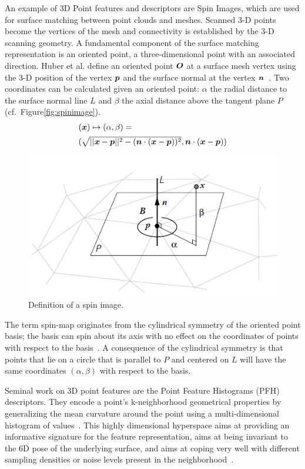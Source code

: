 \documentclass[twocolumn,oneside]{book}
\newcommand{\V}[1]{\vector{#1}}  %
\begin{document}
\begin{itemize}
  An example of 3D Point features and descriptors are Spin Images,
  which are used for surface matching between point clouds and meshes.
  Scanned 3-D points become the vertices of the mesh and connectivity
  is established by the 3-D scanning geometry. A fundamental component
  of the surface matching representation is an oriented point, a
  three-dimensional point with an associated direction.  Huber et
  al. define an oriented point $\V O$ at a surface mesh vertex using
  the 3-D position of the vertex $\V p$ and the surface normal at the
  vertex $\V n$~\cite{HuberPhD}.  Two coordinates can be calculated
  given an oriented point: $\alpha$ the radial distance to the surface
  normal line $L$ and $\beta$ the axial distance above the tangent
  plane $P$ (cf.~Figure\ref{fig:spinimage}).
  \begin{align*}
    \begin{array}{l}
  (\V x) \mapsto (\alpha, \beta) = \\[1.1ex]
    (\sqrt{||\V x - \V p||^2 - ( \V n \cdot (\V x -\V p))^2},
      \V n \cdot (\V x - \V p))
      \end{array}
  \end{align*}
  \begin{figure}
    \centering
    \includegraphics[width=0.75\linewidth]{BOOKFIGS/spinimage}
    \caption{Definition of a spin image.}
  \end{figure}  
  The term spin-map originates from the cylindrical symmetry of the
  oriented point basis; the basis can spin about its axis with no
  effect on the coordinates of points with respect to the
  basis~\cite{HuberPhD}. A consequence of the cylindrical symmetry is
  that points that lie on a circle that is parallel to $P$ and centered
  on $L$ will have the same coordinates $(\alpha,\beta)$ with respect
  to the basis.
 
  Seminal work on 3D point features are the Point Feature Histograms
  (PFH) descriptors. They encode a point’s k-neighborhood geometrical
  properties by generalizing the mean curvature around the point using
  a multi-dimensional histogram of values~\cite{RaduPhD}. This highly
  dimensional hyperspace aims at providing an informative signature
  for the feature representation, aims at being invariant to the 6D
  pose of the underlying surface, and aims at coping very well with
  different sampling densities or noise levels present in the
  neighborhood~\cite{pointclouds.org}.


\end{itemize}
\end{document}
